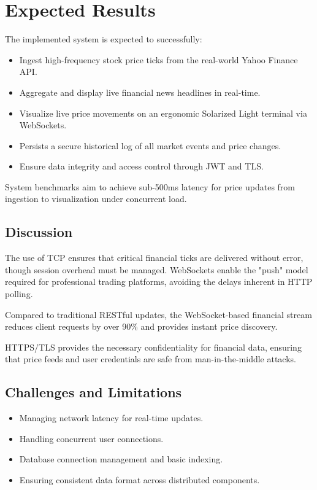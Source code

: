 \chapter{Expected Results}

The implemented system is expected to successfully:

\begin{itemize}
    \item Ingest high-frequency stock price ticks from the real-world Yahoo Finance API.
    \item Aggregate and display live financial news headlines in real-time.
    \item Visualize live price movements on an ergonomic Solarized Light terminal via WebSockets.
    \item Persists a secure historical log of all market events and price changes.
    \item Ensure data integrity and access control through JWT and TLS.
\end{itemize}

System benchmarks aim to achieve sub-500ms latency for price updates from ingestion to visualization under concurrent load.


\section{Discussion}

The use of TCP ensures that critical financial ticks are delivered without error, though session overhead must be managed. WebSockets enable the "push" model required for professional trading platforms, avoiding the delays inherent in HTTP polling.

Compared to traditional RESTful updates, the WebSocket-based financial stream reduces client requests by over 90\% and provides instant price discovery.

HTTPS/TLS provides the necessary confidentiality for financial data, ensuring that price feeds and user credentials are safe from man-in-the-middle attacks.

\section{Challenges and Limitations}

\begin{itemize}
    \item Managing network latency for real-time updates.
    \item Handling concurrent user connections.
    \item Database connection management and basic indexing.
    \item Ensuring consistent data format across distributed components.
\end{itemize}
